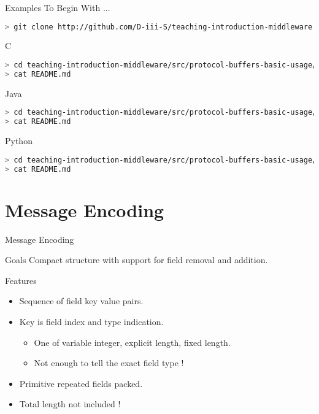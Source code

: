 \begin{frame}[fragile]{Examples To Begin With ...}
\begin{lstlisting}[language=bash,style=mini]
> git clone http://github.com/D-iii-S/teaching-introduction-middleware.git
\end{lstlisting}
    \begin{block}{C}
\begin{lstlisting}[language=bash,style=mini]
> cd teaching-introduction-middleware/src/protocol-buffers-basic-usage/c
> cat README.md
\end{lstlisting}
    \end{block}
    \begin{block}{Java}
\begin{lstlisting}[language=bash,style=mini]
> cd teaching-introduction-middleware/src/protocol-buffers-basic-usage/java
> cat README.md
\end{lstlisting}
    \end{block}
    \begin{block}{Python}
\begin{lstlisting}[language=bash,style=mini]
> cd teaching-introduction-middleware/src/protocol-buffers-basic-usage/python
> cat README.md
\end{lstlisting}
    \end{block}
\end{frame}


\section{Message Encoding}


\begin{frame}{Message Encoding}
    \begin{block}{Goals}
        Compact structure with support for field removal and addition.
    \end{block}

    \bigskip

    \begin{block}{Features}
        \begin{itemize}
            \item Sequence of field key value pairs.
            \item Key is field index and type indication.
                \begin{itemize}
                    \item One of variable integer, explicit length, fixed length.
                    \item Not enough to tell the exact field type !
                \end{itemize}
            \item Primitive repeated fields packed.
            \item Total length not included !
        \end{itemize}
    \end{block}
\end{frame}


